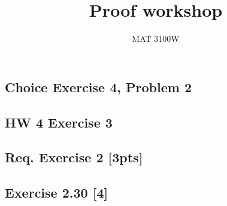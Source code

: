 \documentclass{article}
\title{Proof workshop}
\author{MAT 3100W}
\begin{document}
\maketitle
\newtheorem{proposition}{Proposition}

\pagebreak
\subsection*{Choice Exercise 4, Problem 2}

\pagebreak

\pagebreak
{\color{red!50!black}

\pagebreak

}
\pagebreak

\subsection*{HW 4 Exercise 3}

\pagebreak

\pagebreak
{\color{red!50!black}

\pagebreak

}
\pagebreak

\subsection*{Req. Exercise 2 [3pts]}

\pagebreak

\pagebreak

\subsection{Exercise 2.30 [4]}

\pagebreak

\pagebreak
\end{document}
